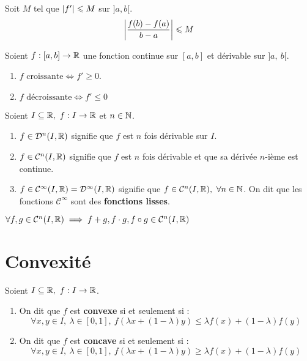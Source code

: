 \begin{corollary}
	Soit $M$ tel que $\abs{f'} \leqslant M$ sur $]a, b[$.
	\[ \abs{\frac{f(b) - f(a)}{b - a}} \leqslant M \]
\end{corollary}

\begin{proposition}
    Soient $f : [a, b] \to \mathbb{R}$ une fonction continue sur $[a, b]$ et dérivable sur $]a,\ b[$.
    \begin{enumerate}
            \item $f \text{ croissante} \iff f' \geq 0$.
            \item $f \text{ décroissante} \iff f' \leq 0$
        \end{enumerate}
\end{proposition}

\begin{definition}
	Soient $I \subseteq \mathbb{R},\ f : I \to \mathbb{R}$ et $n \in \mathbb{N}$.
	\begin{enumerate}
		\item $f \in \mathcal{D}^n(I, \mathbb{R})$ signifie que $f$ est $n$ fois dérivable sur $I$.
		\item $f \in \mathcal{C}^n(I, \mathbb{R})$ signifie que $f$ est $n$ fois dérivable et que sa dérivée $n$-ième est continue.
		\item $f \in \mathcal{C}^{\infty}(I, \mathbb{R}) = \mathcal{D}^{\infty}(I, \mathbb{R})$ signifie que $f \in \mathcal{C}^n(I, \mathbb{R}),\ \forall n \in \mathbb{N}$. On dit que les fonctions $\mathcal{C}^{\infty}$ sont des \textbf{fonctions lisses}.
	\end{enumerate}
\end{definition}

\begin{proposition}
	$\forall f, g \in \mathcal{C}^n(I, \mathbb{R}) \implies f + g, f \cdot g, f \circ g \in \mathcal{C}^n(I, \mathbb{R})$
\end{proposition}

\section{Convexité}
\begin{definition}
    Soient $I \subseteq \mathbb{R},\ f : I \to \mathbb{R}$.
    \begin{enumerate}
        \item On dit que $f$ est \textbf{convexe} si et seulement si : 
        \[ \forall x, y \in I,\ \lambda \in [0, 1],\ f(\lambda x + (1 - \lambda)y) \leq \lambda f(x) + (1 - \lambda) f(y) \]
        \item On dit que $f$ est \textbf{concave} si et seulement si : 
        \[ \forall x, y \in I,\ \lambda \in [0, 1],\ f(\lambda x + (1 - \lambda)y) \geq \lambda f(x) + (1 - \lambda) f(y) \]
    \end{enumerate}
\end{definition}

